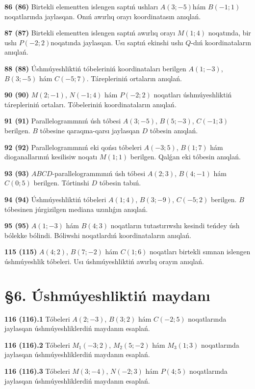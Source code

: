 \documentclass{article}
\begin{document}
\textbf{86 (86)} Birtekli elementten islengen saptıń ushları
$A(3;-5)$hám $B(-1;1)$ noqatlarında jaylasqan. Onıń awırlıq
orayı koordinatasın anıqlań.

\textbf{87 (87)} Birtekli elementten islengen saptıń awırlıq orayı
$M(1;4)$ noqatında, bir ushı $P(-2;2)$noqatında jaylasqan. Usı
saptıń ekinshi ushı $Q$-dıń koordinataların anıqlań.

\textbf{88 (88)} Úshmúyeshliktiń tóbeleriniń koordinataları berilgen
$A(1;-3)$, $B(3;-5)$ hám $C(-5;7)$. Tárepleriniń ortaların
anıqlań.

\textbf{90 (90)} $M(2;-1)$, $N(-1;4)$ hám $P(-2;2)$ noqatları
úshmúyeshliktiń tárepleriniń ortaları. Tóbeleriniń koordinataların
anıqlań.

\textbf{91 (91)} Parallelogrammnıń úsh tóbesi
$A(3;-5)$, $B(5;-3)$, $C(-1;3)$ berilgen. $B$ tóbesine
qaraqma-qarsı jaylasqan $D$ tóbesin anıqlań.

\textbf{92 (92)} Parallelogrammnıń eki qońsı tóbeleri $A(-3;5)$, $B(1;7)$
hám dioganallarınıń kesilisiw noqatı $M(1;1)$ berilgen. Qalǵan eki
tóbesin anıqlań.

\textbf{93 (93)} $ABCD$-parallelogrammınıń úsh tóbesi
$A(2;3)$, $B(4;-1)$ hám $C(0;5)$ berilgen. Tórtinshi $D$
tóbesin tabıń.

\textbf{94 (94)} Úshmúyeshliktiń tóbeleri $A(1;4)$, $B(3;-9)$, $C(-5;2)$
berilgen. $B$ tóbesinen júrgizilgen mediana uzınlıǵın anıqlań.

\textbf{95 (95)} $A(1;-3)$ hám $B(4;3)$ noqatların tutastırıwshı
kesindi teńdey úsh bólekke bólindi. Bóliwshi noqatlardıń koordinataların
anıqlań.

\textbf{115 (115)} $A(4;2)$, $B(7;-2)$ hám $C(1;6)$ noqatları birtekli
sımnan islengen úshmúyeshlik tóbeleri. Usı úshmúyeshliktiń awırlıq
orayın anıqlań.

\section*{\S 6. Úshmúyeshliktiń maydanı}

\textbf{116 (116).1} Tóbeleri $A(2;-3)$, $B(3;2)$ hám $C(-2;5)$ 
noqatlarında jaylasqan úshmúyeshliklerdiń maydanın esaplań.

\textbf{116 (116).2} Tóbeleri $M_1(-3;2)$, $M_2(5;-2)$ hám $M_3(1;3)$ 
noqatlarında jaylasqan úshmúyeshliklerdiń maydanın esaplań.

\textbf{116 (116).3} Tóbeleri $M(3;-4)$, $N(-2;3)$ hám $P(4;5)$ 
noqatlarında jaylasqan úshmúyeshliklerdiń maydanın esaplań.
\end{document}
